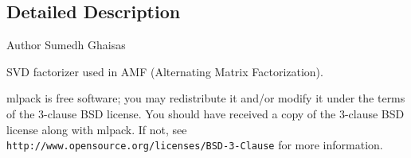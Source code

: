 \subsection{Detailed Description}
\begin{DoxyAuthor}{Author}
Sumedh Ghaisas
\end{DoxyAuthor}
S\+VD factorizer used in A\+MF (Alternating Matrix Factorization).

mlpack is free software; you may redistribute it and/or modify it under the terms of the 3-\/clause B\+SD license. You should have received a copy of the 3-\/clause B\+SD license along with mlpack. If not, see {\tt http\+://www.\+opensource.\+org/licenses/\+B\+S\+D-\/3-\/\+Clause} for more information. 
